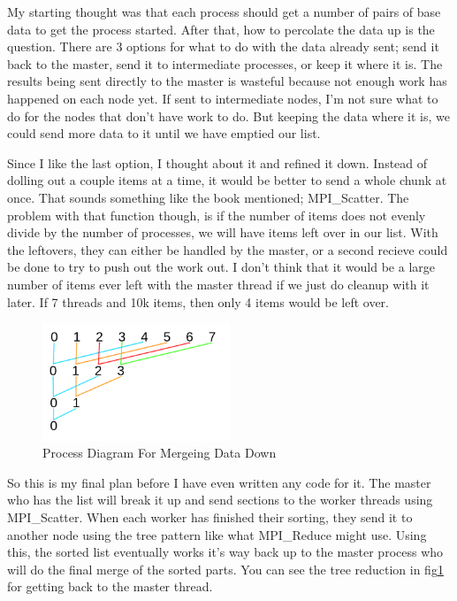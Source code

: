 \documentclass[12pt]{article}
\begin{document}
My starting thought was that each process should get a number of pairs of base data to get the process started.
After that, how to percolate the data up is the question.
There are 3 options for what to do with the data already sent; send it back to the master, send it to intermediate processes, or keep it where it is.
The results being sent directly to the master is wasteful because not enough work has happened on each node yet.
If sent to intermediate nodes, I'm not sure what to do for the nodes that don't have work to do.
But keeping the data where it is, we could send more data to it until we have emptied our list.

Since I like the last option, I thought about it and refined it down.
Instead of dolling out a couple items at a time, it would be better to send a whole chunk at once.
That sounds something like the book mentioned; MPI\_Scatter.
The problem with that function though, is if the number of items does not evenly divide by the number of processes, we will have items left over in our list.
With the leftovers, they can either be handled by the master, or a second recieve could be done to try to push out the work out.
I don't think that it would be a large number of items ever left with the master thread if we just do cleanup with it later. 
If 7 threads and 10k items, then only 4 items would be left over.

\begin{figure}[ht]
	\centering
	\includegraphics[width=0.5\textwidth]{merge_multi.png}
	\caption{Process Diagram For Mergeing Data Down}
	\label{merge_multi}
\end{figure}

So this is my final plan before I have even written any code for it.
The master who has the list will break it up and send sections to the worker threads using MPI\_Scatter.
When each worker has finished their sorting, they send it to another node using the tree pattern like what MPI\_Reduce might use.
Using this, the sorted list eventually works it's way back up to the master process who will do the final merge of the sorted parts.
You can see the tree reduction in fig\ref{merge_multi} for getting back to the master thread.
\end{document}
